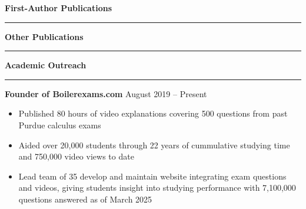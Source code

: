 \documentclass[11pt, a4paper]{article}
\newcommand{\sectiontitle}[1]{{\Large \textbf{#1}}\vspace{0.5em}\hrule\vspace{0.5em}}
\begin{document}
\nocite{*}
\sectiontitle{First-Author Publications}
\printbibliography[heading=none, notkeyword={nobib}, resetnumbers=true]

\sectiontitle{Other Publications}
\printbibliography[heading=none, keyword={nobib}, resetnumbers=true]

\pagebreak
\sectiontitle{Academic Outreach}
\textbf{Founder of Boilerexams.com} \hfill August 2019 -- Present
\begin{itemize}[noitemsep]
    \item Published 80 hours of video explanations covering 500 questions from past Purdue calculus exams
    \item Aided over 20,000 students through 22 years of cummulative studying time and 750,000 video views to date
    \item Lead team of 35 develop and maintain website integrating exam questions and videos, giving students
    insight into studying performance with 7,100,000 questions answered as of March 2025
\end{itemize}
\end{document}
